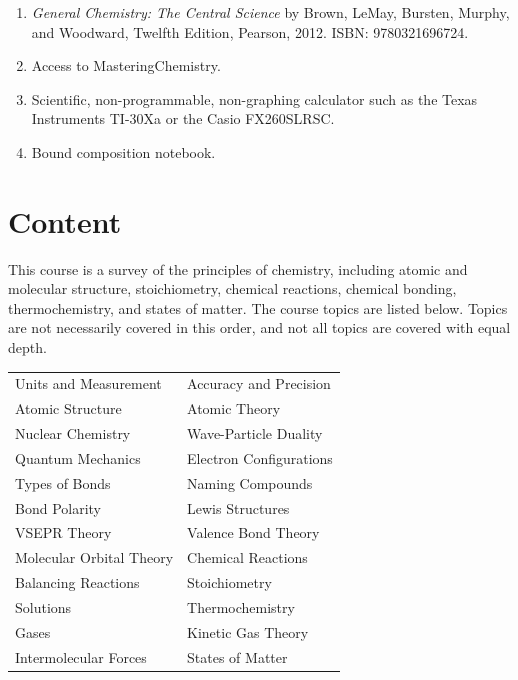\documentclass[letterpaper,oneside,onecolumn,11pt,article]{memoir}
\begin{document}
\begin{enumerate}
\item \textit{General Chemistry: The Central Science} by Brown, LeMay, Bursten, Murphy, and Woodward, Twelfth Edition, Pearson, 2012. ISBN: 9780321696724. 

\item Access to MasteringChemistry. 

\item Scientific, non-programmable, non-graphing calculator such as the Texas Instruments TI-30Xa or the  Casio FX260SLRSC.

\item Bound composition notebook. 
\end{enumerate}

\section{Content}
This course is a survey of the principles of chemistry, including atomic and molecular structure, stoichiometry, chemical reactions, chemical bonding, thermochemistry, and states of matter. The course topics are listed below. Topics are not necessarily covered in this order, and not all topics are covered with equal depth.

\begin{table}[h]
\renewcommand{\arraystretch}{1}
\begin{tabular}{l|l} \toprule
Units and Measurement & Accuracy and Precision \\
Atomic Structure & Atomic Theory \\
Nuclear Chemistry &  Wave-Particle Duality \\
Quantum Mechanics &  Electron Configurations \\
Types of Bonds & Naming Compounds \\
Bond Polarity & Lewis Structures \\
VSEPR Theory & Valence Bond Theory \\
Molecular Orbital Theory & Chemical Reactions \\
Balancing Reactions & Stoichiometry \\
Solutions & Thermochemistry \\
Gases & Kinetic Gas Theory \\
Intermolecular Forces & States of Matter \\
\bottomrule
\end{tabular}
\end{table}
\end{document}

